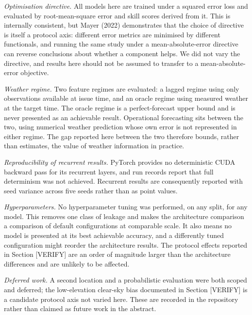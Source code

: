 \textit{Optimisation directive.} All models here are trained under a squared
error loss and evaluated by root-mean-square error and skill scores
derived from it. This is internally consistent, but Mayer (2022)
demonstrates that the choice of directive is itself a protocol axis:
different error metrics are minimised by different functionals, and
running the same study under a mean-absolute-error directive can reverse
conclusions about whether a component helps. We did not vary the
directive, and results here should not be assumed to transfer to a
mean-absolute-error objective.

\textit{Weather regime.} Two feature regimes are evaluated: a lagged regime
using only observations available at issue time, and an oracle regime
using measured weather at the target time. The oracle regime is a
perfect-forecast upper bound and is never presented as an achievable
result. Operational forecasting sits between the two, using numerical
weather prediction whose own error is not represented in either regime.
The gap reported here between the two therefore bounds, rather than
estimates, the value of weather information in practice.

\textit{Reproducibility of recurrent results.} PyTorch provides no
deterministic CUDA backward pass for its recurrent layers, and run
records report that full determinism was not achieved. Recurrent results
are consequently reported with seed variance across five seeds rather
than as point values.

\textit{Hyperparameters.} No hyperparameter tuning was performed, on any split,
for any model. This removes one class of leakage and makes the
architecture comparison a comparison of default configurations at
comparable scale. It also means no model is presented at its best
achievable accuracy, and a differently tuned configuration might reorder
the architecture results. The protocol effects reported in Section
[VERIFY] are an order of magnitude larger than the architecture
differences and are unlikely to be affected.

\textit{Deferred work.} A second location and a probabilistic evaluation
were both scoped and deferred; the low-elevation clear-sky bias
documented in Section [VERIFY] is a candidate protocol axis not varied
here. These are recorded in the repository rather than claimed as future
work in the abstract.
